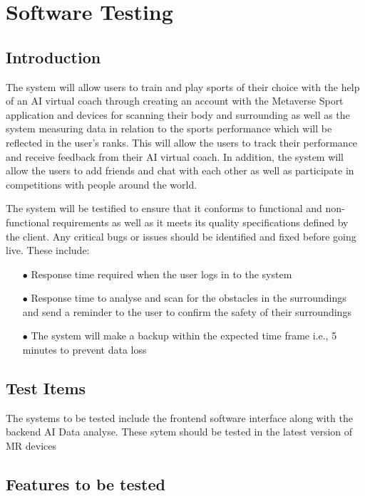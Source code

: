 \documentclass[a4paper]{article}
\begin{document}
	\newpage
	\section{Software Testing}

	\subsection{Introduction}

	The system will allow users to train and play sports of their choice with the help of an AI virtual coach through creating an account with the Metaverse Sport application and devices for scanning their body and surrounding as well as the system measuring data in relation to the sports performance which will be reflected in the user's ranks. This will allow the users to track their performance and receive feedback from their AI virtual coach. In addition, the system will allow the users to add friends and chat with each other as well as participate in competitions with people around the world.\par
	The system will be testified to ensure that it conforms to functional and non-functional requirements as well as it meets its quality specifications defined by the client. Any critical bugs or issues should be identified and fixed before going live. These include:
	\begin{itemize}[itemindent=2em]
		\item[$\bullet$] Response time required when the user logs in to the system
		\item[$\bullet$] Response time to analyse and scan for the obstacles in the surroundings and send a reminder to the user to confirm the safety of their surroundings
		\item[$\bullet$] The system will make a backup within the expected time frame i.e., 5 minutes to prevent data loss 
	\end{itemize}

	\subsection{Test Items}

	The systems to be tested include the frontend software interface along with the backend AI Data analyse. These sytem should be tested in the latest version of MR devices

	\subsection{Features to be tested}
\end{document}
